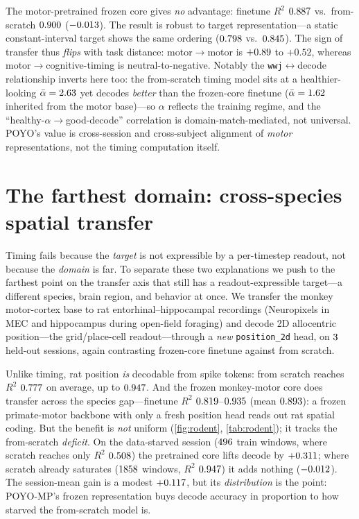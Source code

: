 \documentclass{article} %
\newcommand{\poyo}{POYO\xspace}
\newcommand{\poymp}{POYO-MP\xspace}
\newcommand{\wwj}{\texttt{wwj}\xspace}
\newcommand{\rtwo}{$R^2$\xspace}
\begin{document}
The motor-pretrained frozen core gives \emph{no} advantage: finetune \rtwo{} $0.887$
vs.\ from-scratch $0.900$ ($-0.013$). The result is robust to target
representation---a static constant-interval target shows the same ordering
($0.798$ vs.\ $0.845$). The sign of transfer thus \emph{flips} with task
distance: motor$\to$motor is $+0.89$ to $+0.52$, whereas motor$\to$cognitive-timing is
neutral-to-negative. Notably the \wwj$\leftrightarrow$decode relationship inverts here too:
the from-scratch timing model sits at a healthier-looking $\bar\alpha=2.63$ yet
decodes \emph{better} than the frozen-core finetune ($\bar\alpha=1.62$ inherited from
the motor base)---so $\alpha$ reflects the training regime, and the ``healthy-$\alpha\to$good-decode''
correlation is domain-match-mediated, not universal. \poyo's value is cross-session and
cross-subject alignment of \emph{motor} representations, not the timing computation itself.

\section{The farthest domain: cross-species spatial transfer}
\label{sec:rodent}
Timing fails because the \emph{target} is not expressible by a per-timestep readout, not because
the \emph{domain} is far. To separate these two explanations we push to the farthest point on the
transfer axis that still has a readout-expressible target---a different species, brain region, and
behavior at once. We transfer the monkey motor-cortex base to rat entorhinal--hippocampal
recordings \citep{vollan2025} (Neuropixels in MEC and hippocampus during open-field foraging) and
decode 2D allocentric position---the grid/place-cell readout---through a \emph{new}
\texttt{position\_2d} head, on $3$ held-out sessions, again contrasting frozen-core
finetune against from scratch.

Unlike timing, rat position \emph{is} decodable from spike tokens: from scratch reaches \rtwo{}
$0.777$ on average, up to $0.947$. And the frozen monkey-motor core does
transfer across the species gap---finetune \rtwo{} $0.819$--$0.935$
(mean $0.893$): a frozen primate-motor backbone with only a fresh position head reads out
rat spatial coding. But the benefit is \emph{not} uniform (\cref{fig:rodent}, \cref{tab:rodent});
it tracks the from-scratch \emph{deficit}. On the data-starved session ($496$ train
windows, where scratch reaches only \rtwo{} $0.508$) the pretrained core lifts
decode by $+0.311$; where scratch already saturates ($1858$ windows,
\rtwo{} $0.947$) it adds nothing ($-0.012$). The session-mean gain is a
modest $+0.117$, but its \emph{distribution} is the point: \poymp's frozen representation
buys decode accuracy in proportion to how starved the from-scratch model is.
\end{document}
